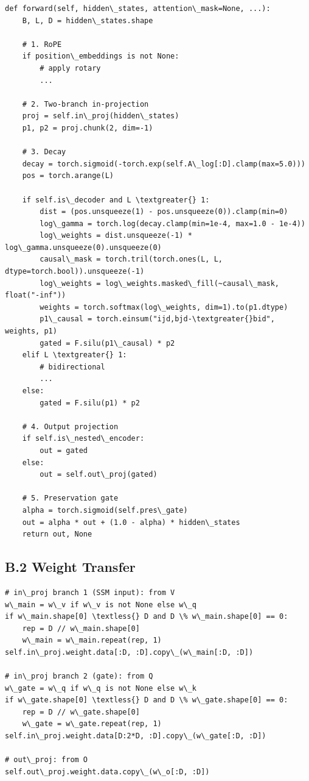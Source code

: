 \begin{lstlisting}
def forward(self, hidden\_states, attention\_mask=None, ...):
    B, L, D = hidden\_states.shape
    
    # 1. RoPE
    if position\_embeddings is not None:
        # apply rotary
        ...
    
    # 2. Two-branch in-projection
    proj = self.in\_proj(hidden\_states)
    p1, p2 = proj.chunk(2, dim=-1)
    
    # 3. Decay
    decay = torch.sigmoid(-torch.exp(self.A\_log[:D].clamp(max=5.0)))
    pos = torch.arange(L)
    
    if self.is\_decoder and L \textgreater{} 1:
        dist = (pos.unsqueeze(1) - pos.unsqueeze(0)).clamp(min=0)
        log\_gamma = torch.log(decay.clamp(min=1e-4, max=1.0 - 1e-4))
        log\_weights = dist.unsqueeze(-1) * log\_gamma.unsqueeze(0).unsqueeze(0)
        causal\_mask = torch.tril(torch.ones(L, L, dtype=torch.bool)).unsqueeze(-1)
        log\_weights = log\_weights.masked\_fill(~causal\_mask, float("-inf"))
        weights = torch.softmax(log\_weights, dim=1).to(p1.dtype)
        p1\_causal = torch.einsum("ijd,bjd-\textgreater{}bid", weights, p1)
        gated = F.silu(p1\_causal) * p2
    elif L \textgreater{} 1:
        # bidirectional
        ...
    else:
        gated = F.silu(p1) * p2
    
    # 4. Output projection
    if self.is\_nested\_encoder:
        out = gated
    else:
        out = self.out\_proj(gated)
    
    # 5. Preservation gate
    alpha = torch.sigmoid(self.pres\_gate)
    out = alpha * out + (1.0 - alpha) * hidden\_states
    return out, None
\end{lstlisting}

\subsection{B.2 Weight Transfer}

\begin{lstlisting}
# in\_proj branch 1 (SSM input): from V
w\_main = w\_v if w\_v is not None else w\_q
if w\_main.shape[0] \textless{} D and D \% w\_main.shape[0] == 0:
    rep = D // w\_main.shape[0]
    w\_main = w\_main.repeat(rep, 1)
self.in\_proj.weight.data[:D, :D].copy\_(w\_main[:D, :D])

# in\_proj branch 2 (gate): from Q
w\_gate = w\_q if w\_q is not None else w\_k
if w\_gate.shape[0] \textless{} D and D \% w\_gate.shape[0] == 0:
    rep = D // w\_gate.shape[0]
    w\_gate = w\_gate.repeat(rep, 1)
self.in\_proj.weight.data[D:2*D, :D].copy\_(w\_gate[:D, :D])

# out\_proj: from O
self.out\_proj.weight.data.copy\_(w\_o[:D, :D])
\end{lstlisting}

